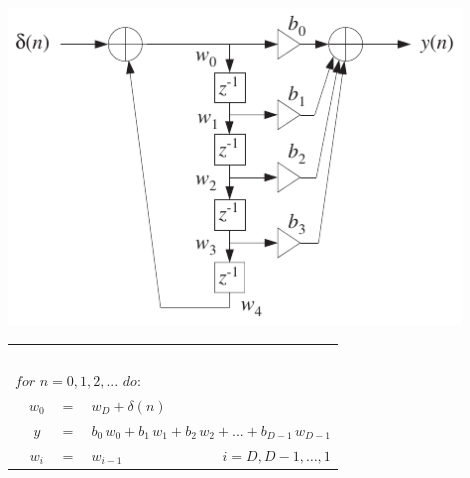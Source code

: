 		\begin{minipage}{0.485\textwidth}
			\includegraphics[width = 0.9\textwidth]{pic/periodischesWFGenKanonischeform.pdf}\\[0.1cm]
			\begin{tabular}{|lclll|}
			\hline &&&&$ $\\[-0.3cm]
			\multicolumn{5}{|l|}{$for\,\, n = 0,1,2,...\,\, do:$}\\
			&$w_0$&$ =$& $w_{D} + \delta(n)$&\\
			&$y$&$ = $&\multicolumn{2}{l|}{$b_0\,w_0 + b_1\,w_1 + b_2\,w_2 + ... + b_{D-1}\,w_{D-1}$}\\
			&$w_i$& $=$&$ w_{i-1}$ & $\qquad \quad i = D,D-1,\hdots,1$\\[0.1cm]
			\hline
			\end{tabular}
		\end{minipage}\\[0.1cm]
		
